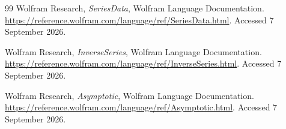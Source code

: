 \documentclass[11pt,a4paper]{article}
\numberwithin{equation}{section}
\theoremstyle{definition}\newtheorem{definition}[theorem]{Definition}
\theoremstyle{remark}\newtheorem{remark}[theorem]{Remark}
\begin{document}
\begin{thebibliography}{99}
Wolfram Research, \emph{SeriesData}, Wolfram Language Documentation.
\url{https://reference.wolfram.com/language/ref/SeriesData.html}.
Accessed 7 September 2026.

Wolfram Research, \emph{InverseSeries}, Wolfram Language Documentation.
\url{https://reference.wolfram.com/language/ref/InverseSeries.html}.
Accessed 7 September 2026.

Wolfram Research, \emph{Asymptotic}, Wolfram Language Documentation.
\url{https://reference.wolfram.com/language/ref/Asymptotic.html}.
Accessed 7 September 2026.
\end{thebibliography}
\end{document}
